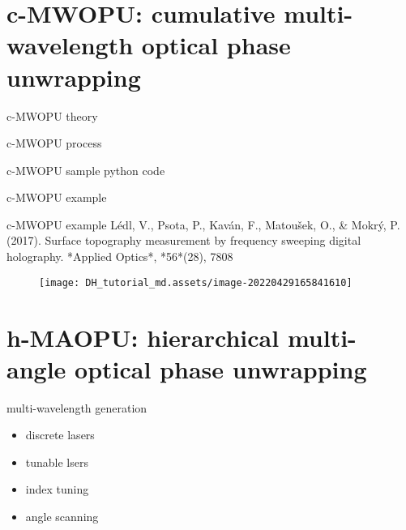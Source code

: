 \documentclass[t, aspectratio=169]{beamer}
\begin{document}
\section{c-MWOPU: cumulative multi-wavelength optical phase unwrapping}
\begin{frame}[c]
\centering\LARGE\textbf{\secname}
\end{frame}


\begin{frame}{c-MWOPU theory}

\end{frame}


\begin{frame}{c-MWOPU process}

\end{frame}


\begin{frame}{c-MWOPU sample python code}

\end{frame}


\begin{frame}{c-MWOPU example}

\end{frame}


\begin{frame}{c-MWOPU example}
Lédl, V., Psota, P., Kaván, F., Matoušek, O., \& Mokrý, P. (2017). Surface topography measurement by frequency sweeping digital holography. *Applied Optics*, *56*(28), 7808
\begin{figure}
	\texttt{[image: DH\_tutorial\_md.assets/image-20220429165841610]}
\end{figure}
\end{frame}


\section{h-MAOPU: hierarchical multi-angle optical phase unwrapping}
\begin{frame}[c]
\centering\LARGE\textbf{\secname}
\end{frame}


\begin{frame}{multi-wavelength generation}
\begin{itemize}
\item discrete lasers
\item tunable lsers
\item index tuning
\item angle scanning
\end{itemize}
\end{frame}
\end{document}
